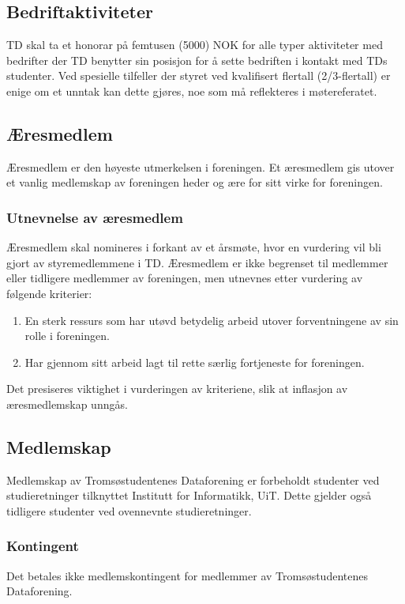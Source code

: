 \documentclass[11pt]{article}
\begin{document}
\subsection{Bedriftaktiviteter}
TD skal ta et honorar på femtusen (5000) NOK for alle typer aktiviteter med bedrifter der TD benytter sin posisjon for å sette bedriften i kontakt med TDs studenter.
Ved spesielle tilfeller der styret ved kvalifisert flertall (2/3-flertall) er enige om et unntak kan dette gjøres, noe som må reflekteres i møtereferatet.

\subsection{Æresmedlem}
Æresmedlem er den høyeste utmerkelsen i foreningen. Et æresmedlem gis utover et vanlig medlemskap av foreningen heder og ære for sitt virke for foreningen.

\subsubsection{Utnevnelse av æresmedlem}
Æresmedlem skal nomineres i forkant av et årsmøte, hvor en vurdering vil bli gjort av styremedlemmene i TD. Æresmedlem er ikke begrenset til medlemmer eller tidligere medlemmer av foreningen, men utnevnes etter vurdering av følgende kriterier:

\begin{enumerate}
	\item En sterk ressurs som har utøvd betydelig arbeid utover forventningene av sin rolle i foreningen.
	\item Har gjennom sitt arbeid lagt til rette særlig fortjeneste for foreningen.
\end{enumerate}

Det presiseres viktighet i vurderingen av kriteriene, slik at inflasjon av æresmedlemskap unngås.

\subsection{Medlemskap}
Medlemskap av Tromsøstudentenes Dataforening er forbeholdt studenter ved studieretninger tilknyttet Institutt for Informatikk, UiT. Dette gjelder også tidligere studenter ved ovennevnte studieretninger. 

\subsubsection{Kontingent}
Det betales ikke medlemskontingent for medlemmer av Tromsøstudentenes Dataforening.
\end{document}
